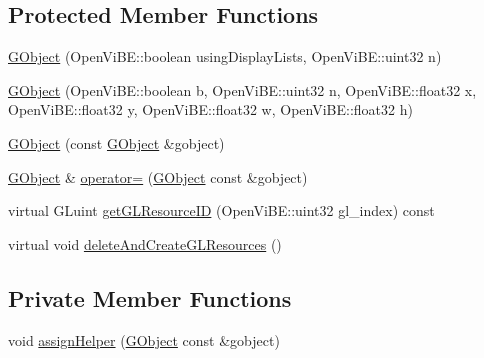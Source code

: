 \subsection*{Protected Member Functions}
\begin{DoxyCompactItemize}
\item 
\hyperlink{classOpenViBEApplications_1_1GObject_a71939b9ef9e2ec3f85009df4c4fc5de8}{GObject} (OpenViBE::boolean usingDisplayLists, OpenViBE::uint32 n)
\item 
\hyperlink{classOpenViBEApplications_1_1GObject_aed7f074f08093ec19e94e0c91add57a5}{GObject} (OpenViBE::boolean b, OpenViBE::uint32 n, OpenViBE::float32 x, OpenViBE::float32 y, OpenViBE::float32 w, OpenViBE::float32 h)
\item 
\hyperlink{classOpenViBEApplications_1_1GObject_a71de49b3150046fa3ad0f5f9c6298c94}{GObject} (const \hyperlink{classOpenViBEApplications_1_1GObject}{GObject} \&gobject)
\item 
\hyperlink{classOpenViBEApplications_1_1GObject}{GObject} \& \hyperlink{classOpenViBEApplications_1_1GObject_a0d98d6206359e7b57a30e90a9f105bf8}{operator=} (\hyperlink{classOpenViBEApplications_1_1GObject}{GObject} const \&gobject)
\item 
virtual GLuint \hyperlink{classOpenViBEApplications_1_1GObject_afecc53f0fa38c61ac826b97e5e9eca74}{getGLResourceID} (OpenViBE::uint32 gl\_\-index) const 
\item 
virtual void \hyperlink{classOpenViBEApplications_1_1GObject_a171fa9ae712d7bf7c9fe0ec74a95835e}{deleteAndCreateGLResources} ()
\end{DoxyCompactItemize}
\subsection*{Private Member Functions}
\begin{DoxyCompactItemize}
\item 
void \hyperlink{classOpenViBEApplications_1_1GObject_a936e62b2b0c985cb4839499665bbcb94}{assignHelper} (\hyperlink{classOpenViBEApplications_1_1GObject}{GObject} const \&gobject)
\end{DoxyCompactItemize}
